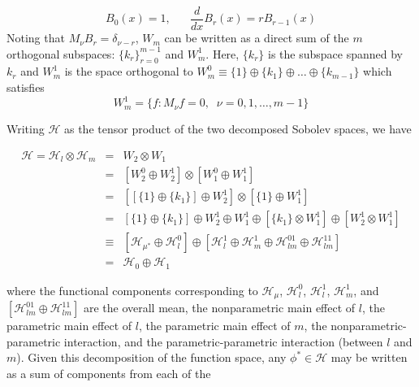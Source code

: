 \[
B_0\left(x\right) = 1,\;\;\;\;\;\; \frac{d}{dx} B_r\left(x\right) = rB_{r-1}\left(x\right)
\]
\noindent
Noting that $M_\nu B_r = \delta_{\nu-r}$, $W_m$ can be written as a direct sum of the $m$ orthogonal subspaces: $\lbrace k_r \rbrace_{r=0}^{m-1}$ and $W_m^1$.   Here, $\lbrace k_r \rbrace$ is the subspace spanned by $k_r$ and $W_m^1$ is the space orthogonal to $W_m^0 \equiv \lbrace 1 \rbrace \oplus \lbrace k_1 \rbrace \oplus \dots \oplus \lbrace k_{m-1} \rbrace$ which satisfies 
\[
W_m^1 = \lbrace f: M_\nu f = 0,\;\; \nu = 0,1,\dots, m-1\rbrace
\]

\noindent
Writing $\mathcal{H}$ as the tensor product of the two decomposed Sobolev spaces, we have

\begin{eqnarray}
\mathcal{H} = \mathcal{H}_l  \otimes \mathcal{H}_m &=& W_2 \otimes W_1 \label{eq:HilbertDecomp} \\ 
&=& \left[ W_2^0 \oplus W_2^1 \right] \otimes \left[ W_1^0 \oplus W_1^1 \right] \nonumber \\ 
&=& \left[ \left[ \lbrace 1 \rbrace \oplus \lbrace k_1 \rbrace \right] \oplus W_2^1 \right] \otimes \left[ \lbrace 1 \rbrace \oplus W_1^1 \right] \nonumber \\ 
&=&\left[ \lbrace 1 \rbrace  \oplus \lbrace k_1 \rbrace \right] \oplus W_2^1 \oplus W_1^1 \oplus  \left[ \lbrace k_1 \rbrace  \otimes  W_1^1 \right]  \oplus  \left[W_2^1 \otimes  W_1^1   \right] \nonumber \\
&\equiv& \left[ \mathcal{H}_{\mu^*} \oplus \mathcal{H}_l^0 \right] \oplus \left[ \mathcal{H}_l^1 \oplus \mathcal{H}_m^1 \oplus \mathcal{H}_{lm}^{01} \oplus \mathcal{H}_{lm}^{11}\right]
\nonumber\\
&=& \mathcal{H}_0 \oplus \mathcal{H}_1
\nonumber
\end{eqnarray} 

\noindent
where the functional components corresponding to $\mathcal{H}_\mu$, $\mathcal{H}_l^0$, $\mathcal{H}_l^1$, $\mathcal{H}_m^1$, and $\left[ \mathcal{H}_{lm}^{01} \oplus \mathcal{H}_{lm}^{11}\right]$ are the overall mean, the nonparametric main effect of $l$, the parametric main effect of $l$, the parametric main effect of $m$, the nonparametric-parametric interaction, and the parametric-parametric interaction (between $l$ and $m$). Given this decomposition of the function space, any $\phi^* \in \mathcal{H}$ may be written as a sum of components from each of the 

